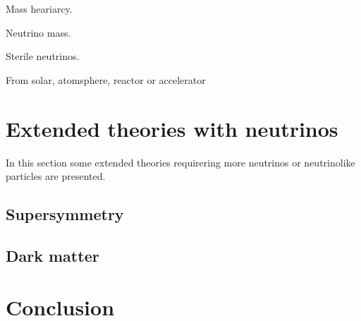 Mass heariarcy. 

Neutrino mass.

Sterile neutrinos.

From solar, atomsphere, reactor or accelerator

\section{Extended theories with neutrinos}
In this section some extended theories requirering more neutrinos or neutrinolike particles are presented.
\subsection{Supersymmetry}
\subsection{Dark matter}

\section{Conclusion}


%

